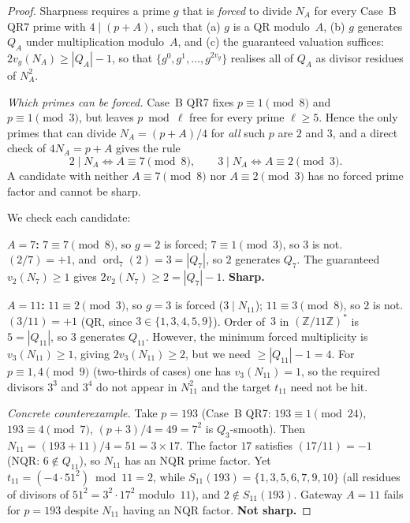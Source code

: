 \documentclass[12pt]{amsart}
\theoremstyle{definition}
\theoremstyle{remark}
\begin{document}
\begin{proof}
Sharpness requires a prime $g$ that is \emph{forced} to divide $N_A$ for
every Case~B QR7 prime with $4 \mid (p+A)$, such that
(a) $g$ is a QR modulo~$A$, (b) $g$ generates $Q_A$ under multiplication
modulo~$A$, and (c) the guaranteed valuation suffices:
$2 v_g(N_A) \ge |Q_A| - 1$, so that $\{g^0, g^1, \ldots, g^{2v_g}\}$
realises all of $Q_A$ as divisor residues of $N_A^2$.

\textit{Which primes can be forced.}
Case~B QR7 fixes $p \equiv 1 \pmod 8$ and $p \equiv 1 \pmod 3$, but leaves
$p \bmod \ell$ free for every prime $\ell \ge 5$. Hence the only primes
that can divide $N_A = (p+A)/4$ for \emph{all} such $p$ are $2$ and $3$,
and a direct check of $4 N_A = p + A$ gives the rule
\[
  2 \mid N_A \iff A \equiv 7 \pmod 8,
  \qquad
  3 \mid N_A \iff A \equiv 2 \pmod 3.
\]
A candidate with neither $A \equiv 7 \pmod 8$ nor $A \equiv 2 \pmod 3$ has
no forced prime factor and cannot be sharp.

We check each candidate:

\textbf{$A = 7$:}
$7 \equiv 7 \pmod 8$, so $g = 2$ is forced; $7 \equiv 1 \pmod 3$, so $3$
is not. $(2/7) = +1$, and $\operatorname{ord}_7(2) = 3 = |Q_7|$, so $2$
generates $Q_7$. The guaranteed $v_2(N_7) \ge 1$ gives
$2 v_2(N_7) \ge 2 = |Q_7| - 1$. \textbf{Sharp.}

\textbf{$A = 11$:}
$11 \equiv 2 \pmod 3$, so $g = 3$ is forced ($3 \mid N_{11}$);
$11 \equiv 3 \pmod 8$, so $2$ is not.
$(3/11) = +1$ (QR, since $3 \in \{1,3,4,5,9\}$).
Order of~$3$ in $(\mathbb{Z}/11\mathbb{Z})^*$ is~$5 = |Q_{11}|$, so $3$
generates $Q_{11}$.
However, the minimum forced multiplicity is $v_3(N_{11}) \ge 1$, giving
$2v_3(N_{11}) \ge 2$, but we need $\ge |Q_{11}|-1 = 4$.
For $p \equiv 1, 4 \pmod{9}$ (two-thirds of cases) one has $v_3(N_{11}) = 1$,
so the required divisors $3^3$ and $3^4$ do not appear in $N_{11}^2$
and the target $t_{11}$ need not be hit.

\emph{Concrete counterexample.}
Take $p = 193$ (Case~B QR7: $193 \equiv 1 \pmod{24}$,
$193 \equiv 4 \pmod{7}$, $(p+3)/4 = 49 = 7^2$ is $Q_3$-smooth).
Then $N_{11} = (193+11)/4 = 51 = 3 \times 17$.
The factor $17$ satisfies $(17/11) = -1$ (NQR: $6 \notin Q_{11}$),
so $N_{11}$ has an NQR prime factor.
Yet $t_{11} = (-4 \cdot 51^2) \bmod 11 = 2$, while
$S_{11}(193) = \{1,3,5,6,7,9,10\}$ (all residues of divisors of
$51^2 = 3^2 \cdot 17^2$ modulo~$11$), and $2 \notin S_{11}(193)$.
Gateway $A = 11$ fails for $p = 193$ despite $N_{11}$ having an NQR factor.
\textbf{Not sharp.}


\end{proof}
\end{document}
